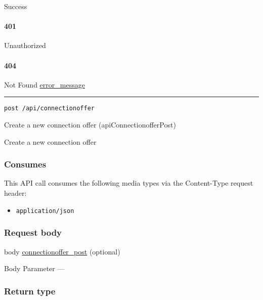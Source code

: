 Success

\hypertarget{section-165}{%
\paragraph{401}\label{section-165}}

Unauthorized \protect\hyperlink{}{}

\hypertarget{section-166}{%
\paragraph{404}\label{section-166}}

Not Found \protect\hyperlink{error_message}{error\_message}

\begin{center}\rule{0.5\linewidth}{\linethickness}\end{center}

\protect\hypertarget{apiConnectionofferPost}{}{}

\begin{verbatim}
post /api/connectionoffer
\end{verbatim}

Create a new connection offer ({apiConnectionofferPost})

Create a new connection offer

\hypertarget{consumes-15}{%
\subsubsection{Consumes}\label{consumes-15}}

This API call consumes the following media types via the {Content-Type}
request header:

\begin{itemize}
\tightlist
\item
  \texttt{application/json}
\end{itemize}

\hypertarget{request-body-15}{%
\subsubsection{Request body}\label{request-body-15}}

body \protect\hyperlink{connectionoffer_post}{connectionoffer\_post}
(optional)

{Body Parameter} ---

\hypertarget{return-type-41}{%
\subsubsection{Return type}\label{return-type-41}}

